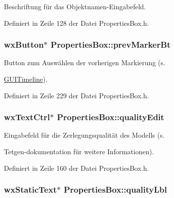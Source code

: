 Beschriftung für das Objektnamen-\/\-Eingabefeld. 



Definiert in Zeile 128 der Datei Properties\-Box.\-h.

\hypertarget{classPropertiesBox_ab315d0ce0bda89ebe2c003d141df2891}{
\subsubsection[{prev\-Marker\-Bt}]{\setlength{\rightskip}{0pt plus 5cm}wx\-Button$\ast$ Properties\-Box\-::prev\-Marker\-Bt\hspace{0.3cm}{\ttfamily [private]}}}\label{classPropertiesBox_ab315d0ce0bda89ebe2c003d141df2891}


Button zum Auswählen der vorherigen Markierung (s. 

\hyperlink{classGUITimeline}{G\-U\-I\-Timeline}). 

Definiert in Zeile 229 der Datei Properties\-Box.\-h.

\hypertarget{classPropertiesBox_ab01869f0f594e103ea5698a480696b99}{
\subsubsection[{quality\-Edit}]{\setlength{\rightskip}{0pt plus 5cm}wx\-Text\-Ctrl$\ast$ Properties\-Box\-::quality\-Edit\hspace{0.3cm}{\ttfamily [private]}}}\label{classPropertiesBox_ab01869f0f594e103ea5698a480696b99}


Eingabefeld für die Zerlegungsqualität des Modells (s. 

Tetgen-\/dokumentation für weitere Informationen). 

Definiert in Zeile 160 der Datei Properties\-Box.\-h.

\hypertarget{classPropertiesBox_ad5339a1b07ae669a349478cf5c3b0fde}{
\subsubsection[{quality\-Lbl}]{\setlength{\rightskip}{0pt plus 5cm}wx\-Static\-Text$\ast$ Properties\-Box\-::quality\-Lbl\hspace{0.3cm}{\ttfamily [private]}}}\label{classPropertiesBox_ad5339a1b07ae669a349478cf5c3b0fde}


